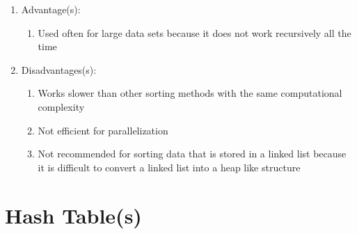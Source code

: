 \documentclass [12pt, executivepaper]{article}
\begin{document}
\begin{enumerate}
\begin{enumerate}
\item Advantage(s):

\begin{enumerate}

\item Used often for large data sets because it does not work recursively all the time

\end{enumerate}

\item Disadvantages(s):

\begin{enumerate}

\item Works slower than other sorting methods with the same computational complexity

\item Not efficient for parallelization

\item Not recommended for sorting data that is stored in a linked list because it is difficult to convert a linked list into a heap like structure

\end{enumerate}

\end{enumerate}
\end{enumerate}

\pagebreak

\vspace*{-40mm}


\section*{Hash Table(s)}
\end{document}
